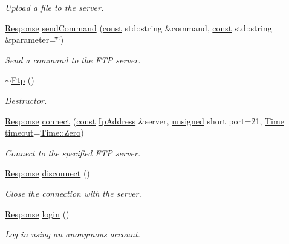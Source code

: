 \begin{DoxyCompactItemize}
\begin{DoxyCompactList}\small\item\em Upload a file to the server. \end{DoxyCompactList}\item 
\hyperlink{classsf_1_1_ftp_1_1_response}{Response} \hyperlink{classsf_1_1_ftp_a44e095103ecbce175a33eaf0820440ff}{send\-Command} (\hyperlink{term__entry_8h_a57bd63ce7f9a353488880e3de6692d5a}{const} std\-::string \&command, \hyperlink{term__entry_8h_a57bd63ce7f9a353488880e3de6692d5a}{const} std\-::string \&parameter=\char`\"{}\char`\"{})
\begin{DoxyCompactList}\small\item\em Send a command to the F\-T\-P server. \end{DoxyCompactList}\item 
\hyperlink{classsf_1_1_ftp_a2edfa8e9009caf27bce74459ae76dc52}{$\sim$\-Ftp} ()
\begin{DoxyCompactList}\small\item\em Destructor. \end{DoxyCompactList}\item 
\hyperlink{classsf_1_1_ftp_1_1_response}{Response} \hyperlink{classsf_1_1_ftp_af02fb3de3f450a50a27981961c69c860}{connect} (\hyperlink{term__entry_8h_a57bd63ce7f9a353488880e3de6692d5a}{const} \hyperlink{classsf_1_1_ip_address}{Ip\-Address} \&server, \hyperlink{curses_8priv_8h_aca40206900cfc164654362fa8d4ad1e6}{unsigned} short port=21, \hyperlink{classsf_1_1_time}{Time} \hyperlink{_ndk_8cpp_a174cf046f3b5dbb1258515b3f138b8c7}{timeout}=\hyperlink{classsf_1_1_time_aa343e67f43a940e7b3b51aa10a495f2f}{Time\-::\-Zero})
\begin{DoxyCompactList}\small\item\em Connect to the specified F\-T\-P server. \end{DoxyCompactList}\item 
\hyperlink{classsf_1_1_ftp_1_1_response}{Response} \hyperlink{classsf_1_1_ftp_acf7459926f3391cd06bf84337ed6a0f4}{disconnect} ()
\begin{DoxyCompactList}\small\item\em Close the connection with the server. \end{DoxyCompactList}\item 
\hyperlink{classsf_1_1_ftp_1_1_response}{Response} \hyperlink{classsf_1_1_ftp_a686262bc377584cd50e52e1576aa3a9b}{login} ()
\begin{DoxyCompactList}\small\item\em Log in using an anonymous account. \end{DoxyCompactList}\item 

\end{DoxyCompactItemize}
